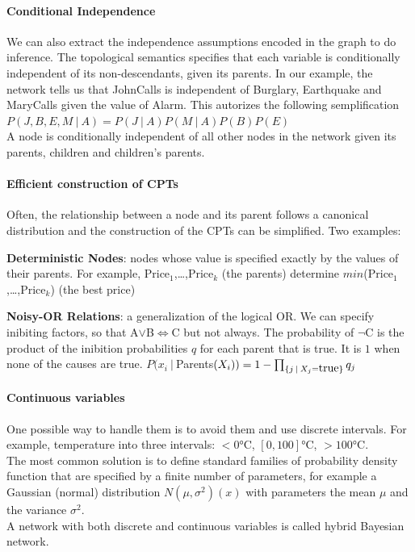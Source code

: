 \documentclass[10pt]{report}
\begin{document}
\paragraph{Conditional Independence} We can also extract the independence assumptions encoded in the graph to do inference. The topological semantics specifies that each variable is conditionally independent of its non-descendants, given its parents. In our example, the network tells us that JohnCalls is independent of Burglary, Earthquake and MaryCalls given the value of Alarm. This autorizes the following semplification $P(J,B,E,M\:|\:A)= P(J\:|\:A)P(M\:|\:A)P(B)P(E)$\\
A node is conditionally independent of all other nodes in the network given its parents, children and children's parents.
\paragraph{Efficient construction of CPTs} Often, the relationship between a node and its parent follows a canonical distribution and the construction of the CPTs can be simplified. Two examples:
\begin{list}{}{}
	\item \textbf{Deterministic Nodes}: nodes whose value is specified exactly by the values of their parents. For example, Price$_1$,\ldots,Price$_k$ (the parents) determine $min$(Price$_1$,\ldots,Price$_k$) (the best price)
	\item \textbf{Noisy-OR Relations}: a generalization of the logical OR. We can specify inibiting factors, so that A$\vee$B$\Leftrightarrow$C but not always. The probability of $\neg$C is the product of the inibition probabilities $q$ for each parent that is true. It is $1$ when none of the causes are true. $P(x_i\:|\:$Parents$(X_i)) = 1-\prod_{\{j\:|\:X_j=\hbox{true}\}}q_j$
\end{list}
\paragraph{Continuous variables} One possible way to handle them is to avoid them and use discrete intervals. For example, temperature into three intervals: $<0$°C, $[0,100]$°C, $>100$°C.\\
The most common solution is to define standard families of probability density function that are specified by a finite number of parameters, for example a Gaussian (normal) distribution $N(\mu,\sigma^2)(x)$ with parameters the mean $\mu$ and the variance $\sigma^2$.\\
A network with both discrete and continuous variables is called hybrid Bayesian network.
\end{document}
